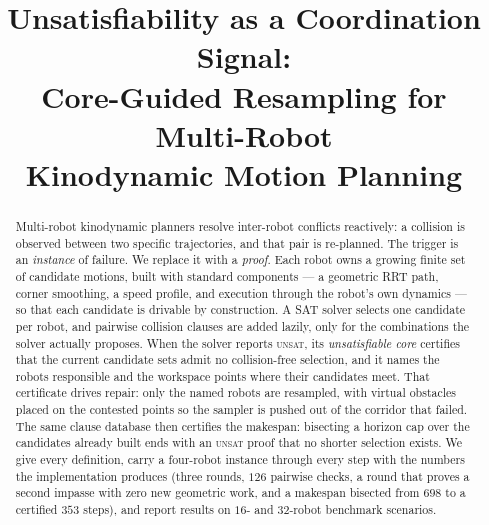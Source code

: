 \documentclass[conference]{IEEEtran}
\theoremstyle{plain}
\theoremstyle{definition}
\begin{document}
\title{Unsatisfiability as a Coordination Signal:\\
Core-Guided Resampling for Multi-Robot\\
Kinodynamic Motion Planning}

\author{
}

\maketitle

\begin{abstract}
Multi-robot kinodynamic planners resolve inter-robot conflicts reactively: a collision is
observed between two specific trajectories, and that pair is re-planned. The trigger is an
\emph{instance} of failure. We replace it with a \emph{proof}. Each robot owns a growing
finite set of candidate motions, built with standard components --- a geometric RRT path,
corner smoothing, a speed profile, and execution through the robot's own dynamics --- so
that each candidate is drivable by construction. A SAT solver selects one candidate per
robot, and pairwise collision clauses are added lazily, only for the combinations the solver
actually proposes. When the solver reports \textsc{unsat}, its \emph{unsatisfiable core}
certifies that the current candidate sets admit no collision-free selection, and it names
the robots responsible and the workspace points where their candidates meet. That
certificate drives repair: only the named robots are resampled, with virtual obstacles
placed on the contested points so the sampler is pushed out of the corridor that failed.
The same clause database then certifies the makespan: bisecting a horizon cap over the
candidates already built ends with an \textsc{unsat} proof that no shorter selection
exists. We give every definition, carry a four-robot instance through every step with the
numbers the implementation produces (three rounds, $126$ pairwise checks, a round that
proves a second impasse with zero new geometric work, and a makespan bisected from $698$ to
a certified $353$ steps), and report results on $16$- and $32$-robot benchmark scenarios.
\end{abstract}
\end{document}

